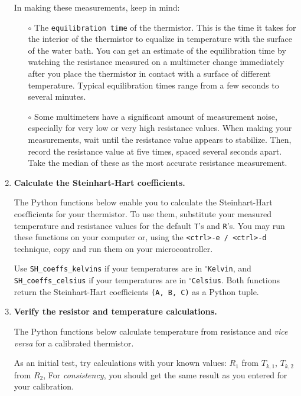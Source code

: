 \begin{enumerate}
	In making these measurements, keep in mind:
	\begin{itemize}
		\item[$\circ$] The \texttt{equilibration time} of the thermistor. 
		This is the time it takes for the interior of the thermistor to equalize in temperature with the surface of the water bath.
		You can get an estimate of the equilibration time by watching the resistance measured on a multimeter change immediately after you place the thermistor in contact with a surface of different temperature. 
		Typical equilibration times range from a few seconds to several minutes.
		\item[$\circ$] %
		Some multimeters have a significant amount of measurement noise, especially for very low or very high resistance values. 
		When making your measurements, wait until the resistance value appears to stabilize. 
		Then, record the resistance value at five times, spaced several seconds apart. 
		Take the median of these as the most accurate resistance measurement. 
	\end{itemize}	
	
	\item \textbf{Calculate the Steinhart-Hart coefficients.}
	
	The Python functions below enable you to calculate the Steinhart-Hart coefficients for your thermistor.
	To use them, substitute your measured temperature and resistance values for the default \texttt{T}'s and \texttt{R}'s.
	You may run these functions on your computer or, using the \texttt{<ctrl>-e / <ctrl>-d} technique, copy and run them on your microcontroller.
	
	\smallskip
	Use \lstinline{SH_coeffs_kelvins} if your temperatures are in $^\circ$\texttt{Kelvin}, and \lstinline{SH_coeffs_celsius} if your temperatures are in $^\circ$\texttt{Celsius}. Both functions return the Steinhart-Hart coefficients \lstinline{(A, B, C)} as a Python tuple.
	
	
	
	\item \textbf{Verify the resistor and temperature calculations.}
	
	The Python functions below calculate temperature from resistance and \textit{vice versa} for a calibrated thermistor.
	
	As an initial test, try calculations with your known values: $R_1$ from $T_{k,1}$, $T_{k,2}$ from $R_2$, \etc
	For \emph{consistency}, you should get the same result as you entered for your calibration.
	

\end{enumerate}
